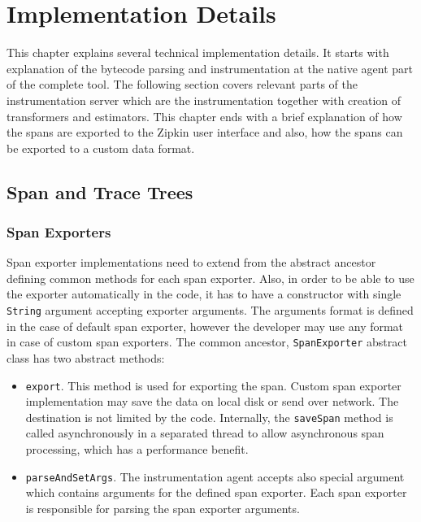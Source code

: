 \chapter{Implementation Details}
\label{chap:implementation}
This chapter explains several technical implementation details. It starts with explanation of the bytecode parsing and instrumentation at the native agent part of the complete tool. The following section covers relevant parts of the instrumentation server which are the instrumentation together with creation of transformers and estimators. This chapter ends with a brief explanation of how the spans are exported to the Zipkin user interface and also, how the spans can be exported to a custom data format.
\section{Span and Trace Trees}
\subsection{Span Exporters}
\label{imp:exporter}
Span exporter implementations need to extend from the abstract ancestor defining common methods for each span exporter. Also, in order to be able to use the exporter automatically in the code, it has to have a constructor with single \texttt{String} argument accepting exporter arguments. The arguments format is defined in the case of default span exporter, however the developer may use any format in case of custom span exporters. The common ancestor, \texttt{SpanExporter} abstract class has two abstract methods:
\begin{itemize}
	\item \texttt{export}. This method is used for exporting the span. Custom span exporter implementation may save the data on local disk or send over network. The destination is not limited by the code. Internally, the \texttt{saveSpan} method is called asynchronously in a separated thread to allow asynchronous span processing, which has a performance benefit.
	\item \texttt{parseAndSetArgs}. The instrumentation agent accepts also special argument which contains arguments for the defined span exporter. Each span exporter is responsible for parsing the span exporter arguments.
\end{itemize}

